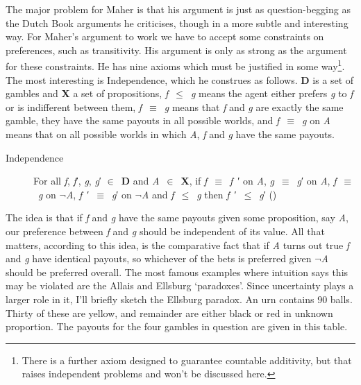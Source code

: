 \documentclass[
  11pt,
  letterpaper,
  DIV=11,
  numbers=noendperiod,
  twoside]{scrartcl}
\begin{document}
The major problem for Maher is that his argument is just as
question-begging as the Dutch Book arguments he criticises, though in a
more subtle and interesting way. For Maher's argument to work we have to
accept some constraints on preferences, such as transitivity. His
argument is only as strong as the argument for these constraints. He has
nine axioms which must be justified in some way\footnote{There is a
  further axiom designed to guarantee countable additivity, but that
  raises independent problems and won't be discussed here.}. The most
interesting is Independence, which he construes as follows. \textbf{D}
is a set of gambles and \textbf{X} a set of propositions,
\emph{f}~\({\leq}\)~\emph{g} means the agent either prefers \emph{g} to
\emph{f} or is indifferent between them, \emph{f}~\({\equiv}\)~\emph{g}
means that \emph{f} and \emph{g} are exactly the same gamble, they have
the same payouts in all possible worlds, and
\emph{f}~\({\equiv}\)~\emph{g} on \emph{A} means that on all possible
worlds in which \emph{A}, \emph{f} and \emph{g} have the same payouts.

\begin{description}
\item[Independence]
For all \emph{f}, \emph{f}′, \emph{g}, \emph{g}′ \({\in}\)~\textbf{D}
and \emph{A}~\({\in}\)~\textbf{X}, if \emph{f}~\({\equiv}\)~\emph{f}~′
on \emph{A}, \emph{g}~\({\equiv}\)~\emph{g}′ on \emph{A},
\emph{f}~\({\equiv}\)~\emph{g} on \({\lnot}\)\emph{A},
\emph{f}~′~\({\equiv}\)~\emph{g}′ on \({\lnot}\)\emph{A} and
\emph{f}~\({\leq}\)~\emph{g} then \emph{f}~′~\({\leq}\)~\emph{g}′
()
\end{description}

The idea is that if \emph{f} and \emph{g} have the same payouts given
some proposition, say \emph{A}, our preference between \emph{f} and
\emph{g} should be independent of its value. All that matters, according
to this idea, is the comparative fact that if \emph{A} turns out true
\emph{f} and \emph{g} have identical payouts, so whichever of the bets
is preferred given \({\lnot}\)\emph{A} should be preferred overall. The
most famous examples where intuition says this may be violated are the
Allais and Ellsburg `paradoxes'. Since uncertainty plays a larger role
in it, I'll briefly sketch the Ellsburg paradox. An urn contains 90
balls. Thirty of these are yellow, and remainder are either black or red
in unknown proportion. The payouts for the four gambles in question are
given in this table.
\end{document}
